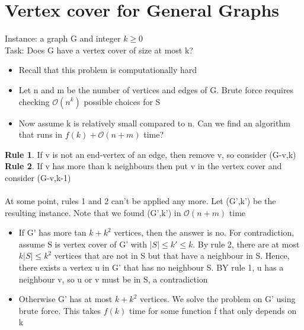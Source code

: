 \documentclass{article}[18pt]
\begin{document}
\section{Vertex cover for General Graphs}
Instance: a graph G and integer $k\geqslant 0$\\
Task: Does G have a vertex cover of size at most k?
\begin{itemize}
	\item Recall that this problem is computationally hard
	\item Let n and m be the number of vertices and edges of G. Brute force requires checking $\mathcal{O}(n^k)$ possible choices for S
	\item Now assume k is relatively small compared to n. Can we find an algorithm that runs in $f(k)+\mathcal{O}(n+m)$ time?
\end{itemize}
\textbf{Rule 1}. If v is not an end-vertex of an edge, then remove v, so consider (G-v,k)\\
\textbf{Rule 2}. If v has more than k neighbours then put v in the vertex cover and consider (G-v,k-1)\\
\\
At some point, rules 1 and 2 can't be applied any more. Let (G',k') be the resulting instance. Note that we found (G',k') in $\mathcal{O}(n+m)$ time
\begin{itemize}
	\item If G' has more tan $k+k^2$ vertices, then the answer is no. For contradiction, assume S is vertex cover of G' with $|S|\leqslant k' \leqslant k$. By rule 2, there are at most $k|S|\leqslant k^2$ vertices that are not in S but that have a neighbour in S. Hence, there exists a vertex u in G' that has no neighbour S. BY rule 1, u has a neighbour v, so u or v must be in S, a contradiction
	\item Otherwise G' has at most $k+k^2$ vertices. We solve the problem on G' using brute force. This takes $f(k)$ time for some function f that only depends on k
\end{itemize}
\end{document}

